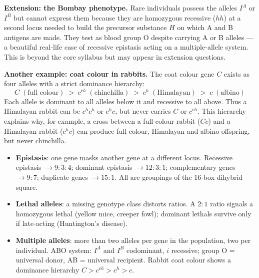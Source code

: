 \documentclass[11pt]{article}
\begin{document}
\textbf{Extension: the Bombay phenotype.} Rare individuals possess the alleles $I^A$ or $I^B$ but cannot express them because they are homozygous recessive ($hh$) at a second locus needed to build the precursor substance $H$ on which A and B antigens are made. They test as blood group O despite carrying A or B alleles — a beautiful real-life case of recessive epistasis acting on a multiple-allele system. This is beyond the core syllabus but may appear in extension questions.

\textbf{Another example: coat colour in rabbits.} The coat colour gene $C$ exists as four alleles with a strict dominance hierarchy:
\[ C \;(\text{full colour}) \;>\; c^{ch} \;(\text{chinchilla}) \;>\; c^{h} \;(\text{Himalayan}) \;>\; c \;(\text{albino}) \]
Each allele is dominant to all alleles below it and recessive to all above. Thus a Himalayan rabbit can be $c^h c^h$ or $c^h c$, but never carries $C$ or $c^{ch}$. This hierarchy explains why, for example, a cross between a full-colour rabbit ($Cc$) and a Himalayan rabbit ($c^h c$) can produce full-colour, Himalayan and albino offspring, but never chinchilla.

\begin{aretenir}
\begin{itemize}
\item \textbf{Epistasis}: one gene masks another gene at a different locus. Recessive epistasis $\rightarrow 9:3:4$; dominant epistasis $\rightarrow 12:3:1$; complementary genes $\rightarrow 9:7$; duplicate genes $\rightarrow 15:1$. All are groupings of the 16-box dihybrid square.
\item \textbf{Lethal alleles}: a missing genotype class distorts ratios. A $2:1$ ratio signals a homozygous lethal (yellow mice, creeper fowl); dominant lethals survive only if late-acting (Huntington's disease).
\item \textbf{Multiple alleles}: more than two alleles per gene in the population, two per individual. ABO system: $I^A$ and $I^B$ codominant, $i$ recessive; group O = universal donor, AB = universal recipient. Rabbit coat colour shows a dominance hierarchy $C > c^{ch} > c^h > c$.
\end{itemize}
\end{aretenir}
\end{document}
